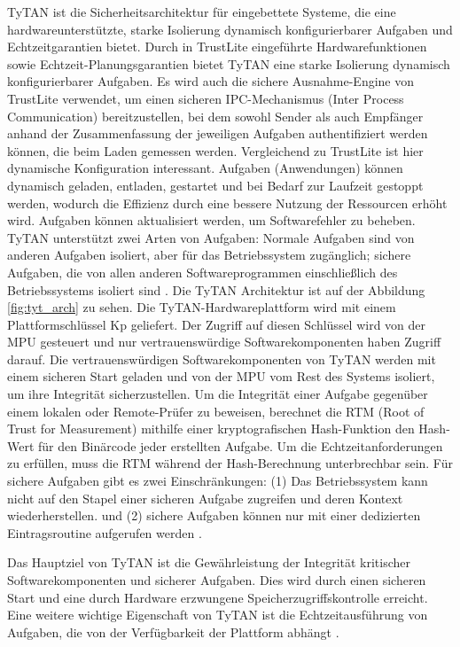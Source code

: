 TyTAN ist die Sicherheitsarchitektur für eingebettete Systeme, die eine hardwareunterstützte, starke Isolierung dynamisch konfigurierbarer Aufgaben und Echtzeitgarantien bietet. Durch in TrustLite eingeführte Hardwarefunktionen sowie Echtzeit-Planungsgarantien bietet TyTAN eine starke Isolierung dynamisch konfigurierbarer Aufgaben. Es wird auch die sichere Ausnahme-Engine von TrustLite verwendet, um einen sicheren IPC-Mechanismus (Inter Process Communication) bereitzustellen, bei dem sowohl Sender als auch Empfänger anhand der Zusammenfassung der jeweiligen Aufgaben authentifiziert werden können, die beim Laden gemessen werden. Vergleichend zu TrustLite ist hier dynamische Konfiguration interessant. Aufgaben (Anwendungen) können dynamisch geladen, entladen, gestartet und bei Bedarf zur Laufzeit gestoppt werden, wodurch die Effizienz durch eine bessere Nutzung der Ressourcen erhöht wird. Aufgaben können aktualisiert werden, um Softwarefehler zu beheben. TyTAN unterstützt zwei Arten von Aufgaben: Normale Aufgaben sind von anderen Aufgaben isoliert, aber für das Betriebssystem zugänglich; sichere Aufgaben, die von allen anderen Softwareprogrammen einschließlich des Betriebssystems isoliert sind \cite[p.2]{website:TyTAN}. Die TyTAN Architektur ist auf der Abbildung \ref{fig:tyt_arch} zu sehen. Die TyTAN-Hardwareplattform wird mit einem Plattformschlüssel Kp geliefert. Der Zugriff auf diesen Schlüssel wird von der MPU gesteuert und nur vertrauenswürdige Softwarekomponenten haben Zugriff darauf. Die vertrauenswürdigen Softwarekomponenten von TyTAN werden mit einem sicheren Start geladen und von der MPU vom Rest des Systems isoliert, um ihre Integrität sicherzustellen. Um die Integrität einer Aufgabe gegenüber einem lokalen oder Remote-Prüfer zu beweisen, berechnet die RTM (Root of Trust for Measurement) mithilfe einer kryptografischen Hash-Funktion den Hash-Wert für den Binärcode jeder erstellten Aufgabe. Um die Echtzeitanforderungen zu erfüllen, muss die RTM während der Hash-Berechnung unterbrechbar sein. Für sichere Aufgaben gibt es zwei Einschränkungen: (1) Das Betriebssystem kann nicht auf den Stapel einer sicheren Aufgabe zugreifen und deren Kontext wiederherstellen. und (2) sichere Aufgaben können nur mit einer dedizierten Eintragsroutine aufgerufen werden \cite[p.3]{website:TyTAN}. 

Das Hauptziel von TyTAN ist die Gewährleistung der Integrität kritischer Softwarekomponenten und sicherer Aufgaben. Dies wird durch einen sicheren Start und eine durch Hardware erzwungene Speicherzugriffskontrolle erreicht. Eine weitere wichtige Eigenschaft von TyTAN ist die Echtzeitausführung von Aufgaben, die von der Verfügbarkeit der Plattform abhängt \cite[p.4]{website:TyTAN}.

